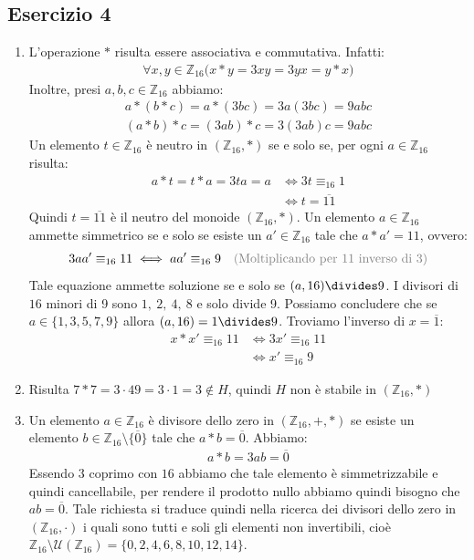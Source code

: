 \subsection*{Esercizio 4}
\begin{enumerate}[label=(\textit{\roman*})]
	\item L'operazione $\ast$ risulta essere associativa e commutativa. Infatti:
	\begin{align*}
		\forall x,y \in \mathbb{Z}_{16} \bigl( x \ast y = 3xy = 3yx = y \ast x \bigr)
	\end{align*}
Inoltre, presi $a,b,c \in \mathbb{Z}_{16}$ abbiamo:
\begin{align*}
	a \ast (b \ast c ) = a \ast (3bc) = 3a(3bc) = 9abc \\
	(a \ast b) \ast c = (3ab) \ast c = 3(3ab)c = 9abc
\end{align*}
Un elemento $t \in \mathbb{Z}_{16}$ è neutro in $(\mathbb{Z}_{16},\ast)$ se e solo se, per ogni $a \in \mathbb{Z}_{16}$ risulta:
\begin{align*}
	a \ast t = t \ast a  = 3ta = a &\iff 3t \equiv_{16} 1 \\
	&\iff t = \overline{11}
\end{align*}
Quindi $t= \overline{11}$ è il neutro del monoide $(\mathbb{Z}_{16},\ast)$. Un elemento $a \in \mathbb{Z}_{16}$ ammette simmetrico se e solo se esiste un $a' \in \mathbb{Z}_{16}$ tale che $a \ast a' = 11$, ovvero:
\begin{align*}
	3aa' \equiv_{16} 11 &\iff aa' \equiv_{16} 9 & \text{\textcolor{gray}{(Moltiplicando per 11 inverso di 3)}}
\end{align*}
Tale equazione ammette soluzione se e solo se $(a,16) \divides 9$. I divisori di $16$ minori di 9 sono $1, \ 2, \ 4, \ 8$ e solo divide 9. Possiamo concludere che se $a \in \{1,3,5,7,9\}$ allora $(a,16)=1 \divides 9$. Troviamo l'inverso di $x=\overline{1}$:
\begin{align*}
	x \ast x' \equiv_{16} 11 &\iff 3x' \equiv_{16} 11 \\
	&\iff x' \equiv_{16} 9
\end{align*}
	\item Risulta $7 \ast 7 = 3 \cdot 49 = 3 \cdot 1 = 3 \notin H$, quindi $H$ non è stabile in $(\mathbb{Z}_{16},\ast)$
	\item Un elemento $a \in \mathbb{Z}_{16}$ è divisore dello zero in $(\mathbb{Z}_{16},+,\ast)$ se esiste un elemento $b \in \mathbb{Z}_{16} \setminus \{\overline{0}\}$ tale che $ a \ast b=\overline{0}$. Abbiamo:
	\begin{align*}
		a \ast b = 3ab = \overline{0}
	\end{align*}
Essendo $3$ coprimo con $16$ abbiamo che tale elemento è simmetrizzabile e quindi cancellabile, per rendere il prodotto nullo abbiamo quindi bisogno che $ab = \overline{0}$. Tale richiesta si traduce quindi nella ricerca dei divisori dello zero in $(\mathbb{Z}_{16},\cdot)$ i quali sono tutti e soli gli elementi non invertibili, cioè $\mathbb{Z}_{16} \setminus \mathcal{U}(\mathbb{Z}_{16}) = \{0,2,4,6,8,10,12,14\}$.
\end{enumerate}
